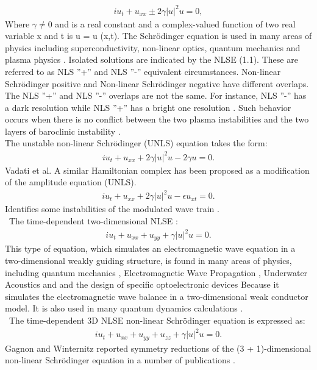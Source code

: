 \documentclass{article}
\numberwithin{equation}{section}
\begin{document}
\begin{eqnarray}
i u_{t}+u_{\mathit{xx}}\pm 2 \gamma  {| u |}^{2} u = 0,
\end{eqnarray}
Where $\gamma\neq {0}$ and is a real constant and a complex-valued function of two real variable x and t is u = u (x,t). The Schr\"{o}dinger equation is used in many areas of physics including superconductivity, non-linear optics, quantum mechanics and plasma physics \cite{a18}. Isolated solutions are indicated by the NLSE (1.1). These are referred to as NLS ''+'' and NLS ''-'' equivalent circumstances. Non-linear Schr\"{o}dinger positive and Non-linear Schr\"{o}dinger negative have different overlaps. The NLS ''+'' and NLS ''-'' overlaps are not the same. For instance, NLS ''-'' has a dark resolution while NLS ''+'' has a bright one resolution \cite{a19}. Such behavior occurs when there is no conflict between the two plasma instabilities \cite{a20} and the two layers of baroclinic instability \cite{a21}.\\
The unstable non-linear Schr\"{o}dinger (UNLS) equation takes the form:
\begin{eqnarray}
\mathit{iu}_{t}+u_{\mathit{xx}}+2 \gamma  {| u |}^{2} u -2 \gamma  u =  0.
\end{eqnarray}
Vadati et al.\cite{a22} A similar Hamiltonian complex has been proposed as a modification of the amplitude equation (UNLS).
\begin{eqnarray}
\mathit{iu}_{t}+u_{\mathit{xx}}+2 \gamma  {| u |}^{2} u -\epsilon  u_{\mathit{xt}} =  0.
\end{eqnarray}
Identifies some instabilities of the modulated wave train \cite{a23}.\\\
The time-dependent two-dimensional NLSE :
\begin{eqnarray}
\mathit{iu}_{t}+u_{\mathit{xx}}+u_{\mathit{yy}}+\gamma  {| u |}^{2} u =  0.
\end{eqnarray}
This type of equation, which simulates an electromagnetic wave equation in a two-dimensional weakly guiding structure, is found in many areas of physics, including quantum mechanics \cite{a24}, Electromagnetic Wave Propagation \cite{a25}, Underwater Acoustics \cite{a26} and  and the design of specific optoelectronic devices \cite{a27} Because it simulates the electromagnetic wave balance in a two-dimensional weak conductor model. It is also used in many quantum dynamics calculations \cite{a28}.\\\
The time-dependent 3D NLSE non-linear Schr\"{o}dinger equation is expressed as:
\begin{eqnarray}
i u_{t}+u_{\mathit{xx}}+u_{\mathit{yy}}+u_{\mathit{zz}}+\gamma  {| u |}^{2} u =  0.
\end{eqnarray}
Gagnon and Winternitz reported symmetry reductions of the (3 + 1)-dimensional non-linear Schr\"{o}dinger equation in a number of publications \cite{a29,a30,a31,a32,a33}.\\
\end{document}
